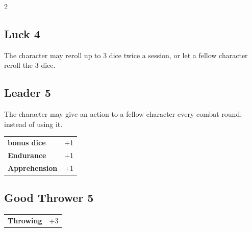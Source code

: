 \begin{multicols}{2}
\begin{tcolorbox}
\end{tcolorbox}

\begin{tcolorbox}
    \subsection*{Luck \hfill \small{4 }}
    \tcblower
The character may reroll up to 3 dice twice a session, or let a fellow character reroll the 3 dice.


\vspace{3mm}



\end{tcolorbox}

\begin{tcolorbox}
    \subsection*{Leader \hfill \small{5 }}
    \tcblower
The character may give an action to a fellow character every combat round, instead of using it.


\vspace{3mm}

\begin{tabular}{@{}ll@{}}
    \textbf{bonus dice} & +1\\
    \textbf{Endurance} & +1\\
    \textbf{Apprehension} & +1\\
\end{tabular}


\end{tcolorbox}

\begin{tcolorbox}
    \subsection*{Good Thrower \hfill \small{5 }}
    \tcblower




\begin{tabular}{@{}ll@{}}
    \textbf{Throwing} & +3\\
\end{tabular}


\end{tcolorbox}
\end{multicols}
